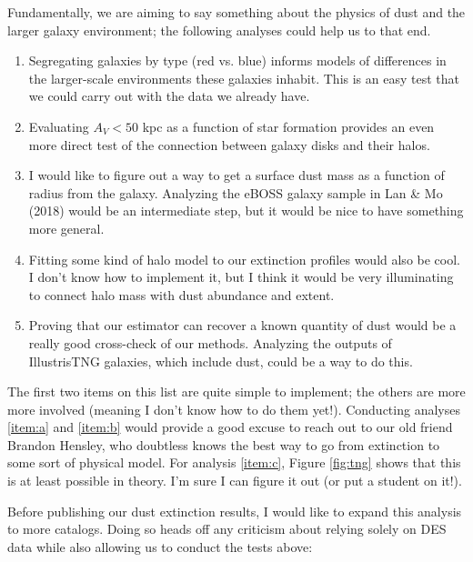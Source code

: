 \documentclass[11pt, oneside]{article}   	%
\begin{document}
Fundamentally, we are aiming to say something about the physics of dust and the larger galaxy environment; the following analyses could help us to that end.

\begin{enumerate}
\item Segregating galaxies by type (red vs. blue) informs models of differences in the larger-scale environments these galaxies inhabit. This is an easy test that we could carry out with the data we already have. 
\item Evaluating $A_V < 50$ kpc as a function of star formation provides an even more direct test of the connection between galaxy disks and their halos. 
\item I would like to figure out a way to get a surface dust mass as a function of radius from the galaxy. Analyzing the eBOSS galaxy sample in Lan \& Mo (2018) would be an intermediate step, but it would be nice to have something more general. \label{item:a}
\item Fitting some kind of halo model to our extinction profiles would also be cool. I don't know how to implement it, but I think it would be very illuminating to connect halo mass with dust abundance and extent. \label{item:b}
\item Proving that our estimator can recover a known quantity of dust would be a really good cross-check of our methods. Analyzing the outputs of IllustrisTNG galaxies, which include dust, could be a way to do this. \label{item:c}
\end{enumerate} 

The first two items on this list are quite simple to implement; the others are more more involved (meaning I don't know how to do them yet!). Conducting analyses \ref{item:a} and \ref{item:b} would provide a good excuse to reach out to our old friend Brandon Hensley, who doubtless knows the best way to go from extinction to some sort of physical model. For analysis \ref{item:c}, Figure \ref{fig:tng} shows that this is at least possible in theory. I'm sure I can figure it out (or put a student on it!). 

Before publishing our dust extinction results, I would like to expand this analysis to more catalogs. Doing so heads off any criticism about relying solely on DES data while also allowing us to conduct the tests above:
\end{document}
